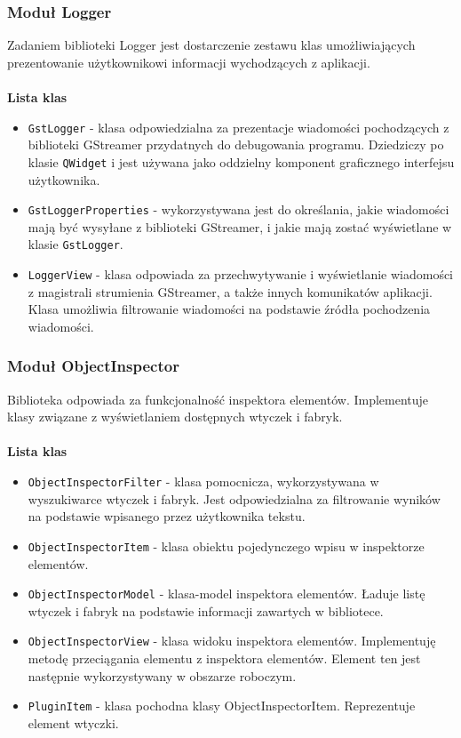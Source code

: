 \documentclass[12pt]{article}
\begin{document}
\subsubsection{Moduł Logger}
Zadaniem biblioteki Logger jest dostarczenie zestawu klas umożliwiających prezentowanie użytkownikowi informacji wychodzących z aplikacji. 
\paragraph{}
\textbf{Lista klas}
\vspace{-2mm}
\begin{itemize}
  \setlength{\itemsep}{0em}
\item \texttt{GstLogger} - klasa odpowiedzialna za prezentacje wiadomości pochodzących z biblioteki GStreamer przydatnych do debugowania programu. Dziedziczy po klasie \texttt{QWidget} i jest używana jako oddzielny komponent graficznego interfejsu użytkownika.
\item \texttt{GstLoggerProperties} - wykorzystywana jest do określania, jakie wiadomości mają być wysyłane z biblioteki GStreamer, i jakie mają zostać wyświetlane w klasie \texttt{GstLogger}.
\item \texttt{LoggerView} - klasa odpowiada za przechwytywanie i wyświetlanie wiadomości z magistrali strumienia GStreamer, a także innych komunikatów aplikacji. Klasa umożliwia filtrowanie wiadomości na podstawie źródła pochodzenia wiadomości.
\end{itemize}
\subsubsection{Moduł ObjectInspector}
Biblioteka odpowiada za funkcjonalność inspektora elementów. Implementuje klasy związane z wyświetlaniem dostępnych wtyczek i fabryk.
\paragraph{}
\textbf{Lista klas}
\vspace{-2mm}
\begin{itemize}
  \setlength{\itemsep}{0em}
\item \texttt{ObjectInspectorFilter} - klasa pomocnicza, wykorzystywana w wyszukiwarce wtyczek i fabryk. Jest odpowiedzialna za filtrowanie wyników na podstawie wpisanego przez użytkownika tekstu.
\item \texttt{ObjectInspectorItem} - klasa obiektu pojedynczego wpisu w inspektorze elementów. 
\item \texttt{ObjectInspectorModel} - klasa-model inspektora elementów. Ładuje listę wtyczek i fabryk na podstawie informacji zawartych w bibliotece.
\item \texttt{ObjectInspectorView} - klasa widoku inspektora elementów. Implementuję metodę przeciągania elementu z inspektora elementów. Element ten jest następnie wykorzystywany w obszarze roboczym.
\item \texttt{PluginItem} - klasa pochodna klasy ObjectInspectorItem. Reprezentuje element wtyczki.
\end{itemize}  
\end{document}
